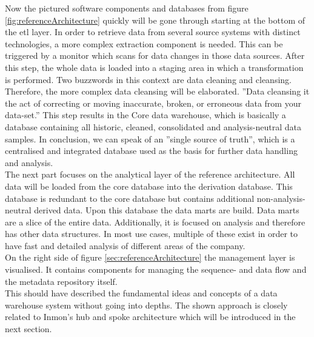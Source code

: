 Now the pictured software components and databases from figure \ref{fig:referenceArchitecture} quickly  will be gone through starting at the bottom of the \acrfull{etl} layer. In order to retrieve data from several source systems with distinct technologies, a more complex extraction component is needed. This can be triggered by a monitor which scans for data changes in those data sources.\newline
After this step, the whole data is loaded into a staging area in which a transformation is performed. Two buzzwords in this context are data cleaning and cleansing. Therefore, the more complex data cleansing will be elaborated.
''Data cleansing it the act of correcting or moving inaccurate, broken, or erroneous data from your data-set.'' \cite{dataCleansing}
This step results in the Core data warehouse, which is basically a database containing all historic, cleaned, consolidated and analysis-neutral data samples. In conclusion, we can speak of an ''single source of truth''\cite{scriptRasch}, which is a centralised and integrated database used as the basis for further data handling and analysis.\newline
\\
The next part focuses on the analytical layer of the reference architecture. All data will be loaded from the core database into the derivation database. This database is redundant to the core database but contains additional non-analysis-neutral derived data. Upon this database the data marts are build. Data marts are a slice of the entire data. Additionally, it is focused on analysis and therefore has other data structures. In most use cases, multiple of these exist in order to have fast and detailed analysis of different areas of the company.\newline
\\
On the right side of figure \ref{sec:referenceArchitecture} the management layer is visualised. It contains components for managing the sequence- and data flow and the metadata repository itself.\newline
\\
This should have described the fundamental ideas and concepts of a data warehouse system without going into depths. The shown approach is closely related to Inmon's hub and spoke architecture which will be introduced in the next section. 
